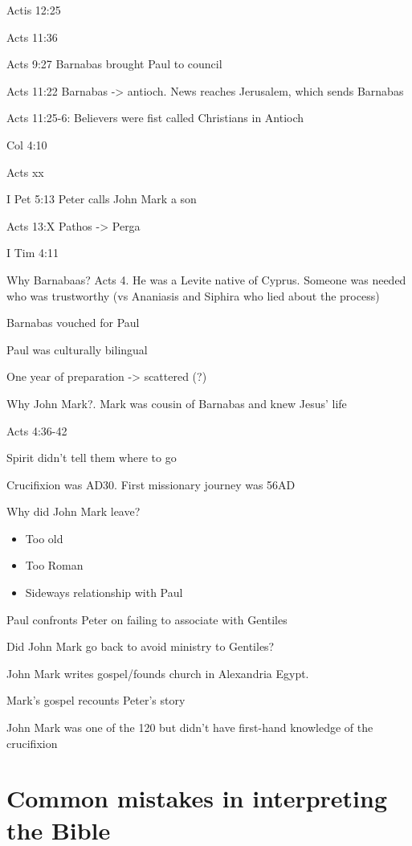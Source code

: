 \documentclass[
]{book}
\providecommand{\tightlist}{%
  \setlength{\itemsep}{0pt}\setlength{\parskip}{0pt}}
\begin{document}
Actis 12:25

Acts 11:36

Acts 9:27 Barnabas brought Paul to council

Acts 11:22 Barnabas -\textgreater{} antioch. News reaches Jerusalem, which sends Barnabas

Acts 11:25-6: Believers were fist called Christians in Antioch

Col 4:10

Acts xx

I Pet 5:13 Peter calls John Mark a son

Acts 13:X Pathos -\textgreater{} Perga

I Tim 4:11

Why Barnabaas? Acts 4. He was a Levite native of Cyprus. Someone was needed who was trustworthy (vs Ananiasis and Siphira who lied about the process)

Barnabas vouched for Paul

Paul was culturally bilingual

One year of preparation -\textgreater{} scattered (?)

Why John Mark?. Mark was cousin of Barnabas and knew Jesus' life

Acts 4:36-42

Spirit didn't tell them where to go

Crucifixion was AD30. First missionary journey was 56AD

Why did John Mark leave?

\begin{itemize}
\tightlist
\item
  Too old
\item
  Too Roman
\item
  Sideways relationship with Paul
\end{itemize}

Paul confronts Peter on failing to associate with Gentiles

Did John Mark go back to avoid ministry to Gentiles?

John Mark writes gospel/founds church in Alexandria Egypt.

Mark's gospel recounts Peter's story

John Mark was one of the 120 but didn't have first-hand knowledge of the crucifixion

\hypertarget{common-mistakes-in-interpreting-the-bible}{%
\section{Common mistakes in interpreting the Bible}\label{common-mistakes-in-interpreting-the-bible}}
\end{document}
